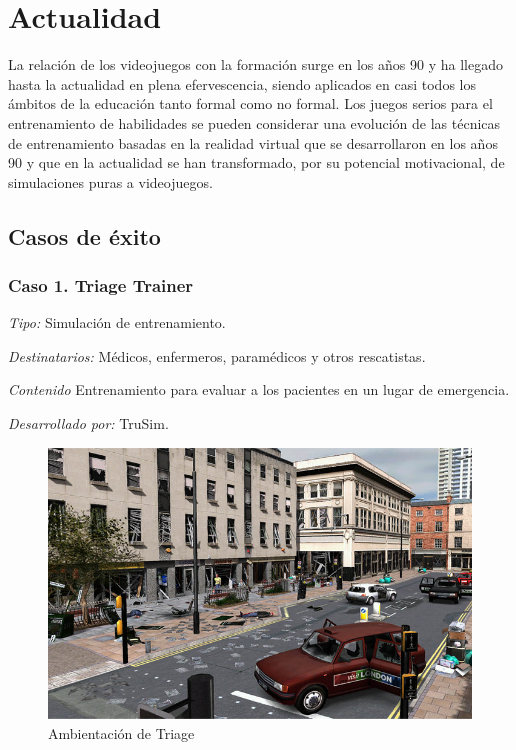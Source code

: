 \section{Actualidad}
\label{sec:tics_ACTUALIDAD}


La relación de los videojuegos con la formación surge en los años 90 y ha llegado hasta
la actualidad en plena efervescencia, siendo aplicados en casi todos los ámbitos de la 
educación tanto formal como no formal. Los juegos serios para el entrenamiento de habilidades se pueden considerar una evolución de las técnicas de entrenamiento basadas
en la realidad virtual que se desarrollaron en los años 90 y que en la actualidad se han
transformado, por su potencial motivacional, de simulaciones puras a videojuegos\cite{videojuegos:gonzaleztardon}.

\subsection{Casos de éxito}


\subsubsection{Caso 1. Triage Trainer}
	

\emph{Tipo: } Simulación de entrenamiento.

\emph{Destinatarios: } Médicos, enfermeros, paramédicos y otros rescatistas.

\emph{Contenido} Entrenamiento para evaluar a los pacientes en un lugar de
emergencia.

\emph{Desarrollado por: } TruSim.

\begin{figure}[h!] 
	\centering 
	\includegraphics[scale=0.5]{tics/images/triage.png}
	\caption{Ambientación de Triage}
	\label{fig:triage}
\end{figure}

